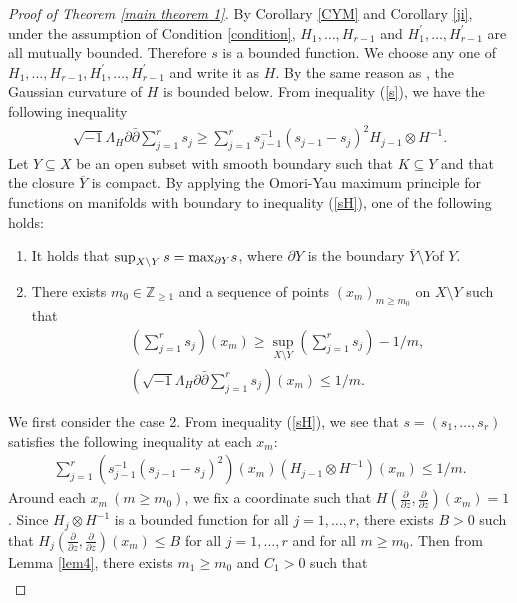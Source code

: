 \documentclass[12pt]{article}
\theoremstyle{definition}
\def\max{{\rm max}}
\def\Z{{\mathbb Z}}
\def\inum{{\sqrt{-1}}}
\begin{document}
\begin{proof}[Proof of Theorem \ref{main theorem 1}] By Corollary \ref{CYM} and Corollary \ref{ji}, under the assumption of Condition \ref{condition}, $H_1,\dots, H_{r-1}$ and $H_1^\prime,\dots, H_{r-1}^\prime$ are all mutually bounded. Therefore $s$ is a bounded function. We choose any one of $H_1,\dots, H_{r-1}, H_1^\prime, \dots, H_{r-1}^\prime$ and write it as $H$. By the same reason as \cite[Lemma 2.4]{LM1}, the Gaussian curvature of $H$ is bounded below. From inequality (\ref{s}), we have the following inequality 
\begin{align}
\inum\Lambda_H\partial\bar{\partial} \sum_{j=1}^rs_j\geq \sum_{j=1}^rs_{j-1}^{-1}(s_{j-1}-s_j)^2H_{j-1}\otimes H^{-1}. \label{sH}
\end{align}
Let $Y\subseteq X$ be an open subset with smooth boundary such that $K\subseteq Y$ and that the closure $\overline{Y}$ is compact. By applying the Omori-Yau maximum principle for functions on manifolds with boundary to inequality (\ref{sH}), one of the following holds:
\begin{enumerate}
\item It holds that $\sup_{X\setminus Y}s=\max_{\partial Y}s$, where $\partial Y$ is the boundary $\overline{Y}\setminus Y$of $Y$.
\item There exists $m_0\in\Z_{\geq 1}$ and a sequence of points $(x_m)_{m\geq m_0}$ on $X\setminus Y$ such that
\begin{align*}
&(\sum_{j=1}^rs_j)(x_m)\geq \sup_{X\setminus Y}(\sum_{j=1}^rs_j)-1/m, \\
&(\inum\Lambda_H\partial \bar{\partial} \sum_{j=1}^rs_j)(x_m)\leq 1/m.
\end{align*}
\end{enumerate}
We first consider the case 2. From inequality (\ref{sH}), we see that $s=(s_1,\dots, s_r)$ satisfies the following inequality at each $x_m$:
\begin{align*}
\sum_{j=1}^r(s_{j-1}^{-1}(s_{j-1}-s_j)^2)(x_m)(H_{j-1}\otimes H^{-1})(x_m)\leq 1/m.
\end{align*}
Around each $x_m\ (m\geq m_0)$, we fix a coordinate such that $H(\frac{\partial}{\partial z}, \frac{\partial }{\partial z})(x_m)=1$. 
Since $H_j\otimes H^{-1}$ is a bounded function for all $j=1,\dots, r$, there exists $B>0$ such that $H_j(\frac{\partial}{\partial z}, \frac{\partial}{\partial z})(x_m)\leq B$ for all $j=1,\dots, r$ and for all $m\geq m_0$. Then from Lemma \ref{lem4}, there exists $m_1\geq m_0$ and $C_1>0$ such that 
\begin{align*}

\end{align*}
\end{proof}
\end{document}
